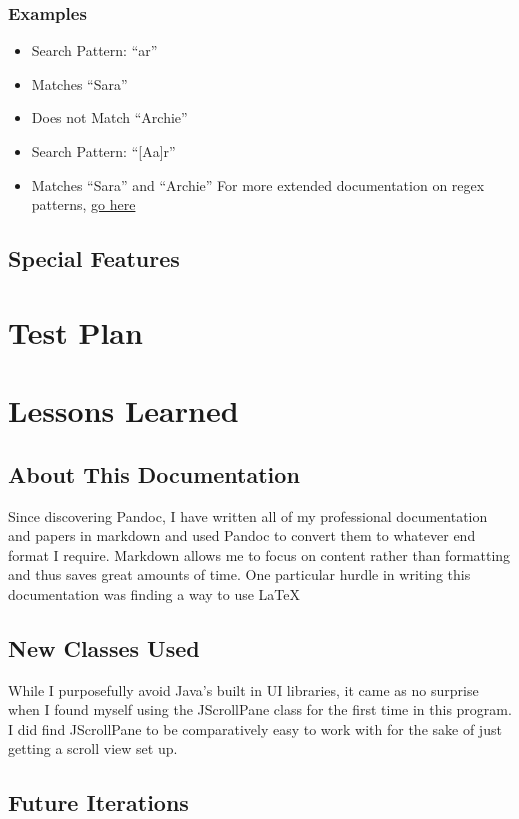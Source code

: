 \documentclass[english,man]{apa6}
\providecommand{\tightlist}{%
  \setlength{\itemsep}{0pt}\setlength{\parskip}{0pt}}
\begin{document}
\subsubsection{Examples}\label{examples}

\begin{itemize}
\tightlist
\item
  Search Pattern: \enquote{ar}
\item
  Matches \enquote{Sara}
\item
  Does not Match \enquote{Archie}
\item
  Search Pattern: \enquote{{[}A\textbar{}a{]}r}
\item
  Matches \enquote{Sara} and \enquote{Archie} For more extended
  documentation on regex patterns,
  \href{http://docs.oracle.com/javase/8/docs/api/java/util/regex/Pattern.html}{go
  here}
\end{itemize}

\subsection{Special Features}\label{special-features}

\section{Test Plan}\label{test-plan}

\section{Lessons Learned}\label{lessons-learned}

\subsection{About This Documentation}\label{about-this-documentation}

Since discovering Pandoc, I have written all of my professional
documentation and papers in markdown and used Pandoc to convert them to
whatever end format I require. Markdown allows me to focus on content
rather than formatting and thus saves great amounts of time. One
particular hurdle in writing this documentation was finding a way to use
\LaTeX~

\subsection{New Classes Used}\label{new-classes-used}

While I purposefully avoid Java's built in UI libraries, it came as no
surprise when I found myself using the JScrollPane class for the first
time in this program. I did find JScrollPane to be comparatively easy to
work with for the sake of just getting a scroll view set up.

\subsection{Future Iterations}\label{future-iterations}

\setlength{\parindent}{-0.5in} \setlength{\leftskip}{0.5in}
\end{document}
